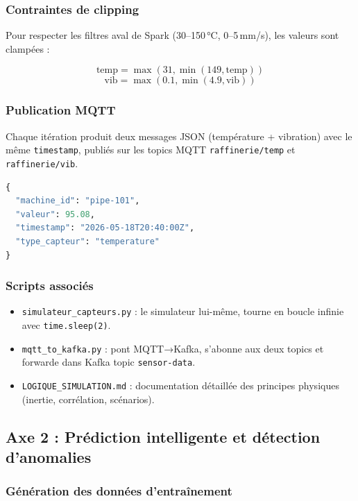 \documentclass[12pt,a4paper]{article}
\begin{document}
\subsubsection{Contraintes de clipping}

Pour respecter les filtres aval de Spark (30--150\,°C, 0--5\,mm/s), les valeurs sont clampées :

\[
\text{temp} = \max(31, \min(149, \text{temp}))
\]
\[
\text{vib} = \max(0.1, \min(4.9, \text{vib}))
\]

\subsubsection{Publication MQTT}

Chaque itération produit deux messages JSON (température + vibration) avec le même \texttt{timestamp}, publiés sur les topics MQTT \texttt{raffinerie/temp} et \texttt{raffinerie/vib}.

\begin{lstlisting}[language=Python,caption={Structure d'un message MQTT},label={lst:mqttmsg}]
{
  "machine_id": "pipe-101",
  "valeur": 95.08,
  "timestamp": "2026-05-18T20:40:00Z",
  "type_capteur": "temperature"
}
\end{lstlisting}

\subsubsection{Scripts associés}

\begin{itemize}
    \item \texttt{simulateur\_capteurs.py} : le simulateur lui-même, tourne en boucle infinie avec \texttt{time.sleep(2)}.
    \item \texttt{mqtt\_to\_kafka.py} : pont MQTT→Kafka, s'abonne aux deux topics et forwarde dans Kafka topic \texttt{sensor-data}.
    \item \texttt{LOGIQUE\_SIMULATION.md} : documentation détaillée des principes physiques (inertie, corrélation, scénarios).
\end{itemize}

\newpage

\subsection{Axe 2 : Prédiction intelligente et détection d'anomalies}

\subsubsection{Génération des données d'entraînement}
\end{document}
